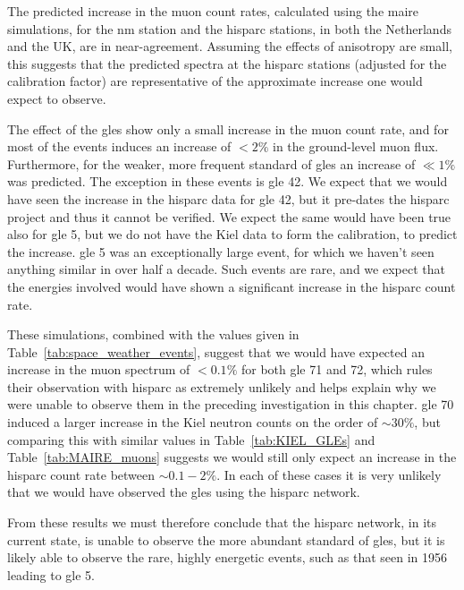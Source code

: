The predicted increase in the muon count rates, calculated using the \gls{maire} simulations, for the \gls{nm} station and the \gls{hisparc} stations, in both the Netherlands and the UK, are in near-agreement. Assuming the effects of anisotropy are small, this suggests that the predicted spectra at the \gls{hisparc} stations (adjusted for the calibration factor) are representative of the approximate increase one would expect to observe.

The effect of the \glspl{gle} show only a small increase in the muon count rate, and for most of the events induces an increase of $< 2 \%$ in the ground-level muon flux. Furthermore, for the weaker, more frequent standard of \glspl{gle} an increase of $\ll 1\%$ was predicted. The exception in these events is \gls{gle} 42. We expect that we would have seen the increase in the \gls{hisparc} data for \gls{gle} 42, but it pre-dates the \gls{hisparc} project and thus it cannot be verified. We expect the same would have been true also for \gls{gle} 5, but we do not have the Kiel data to form the calibration, to predict the increase. \gls{gle} 5 was an exceptionally large event, for which we haven't seen anything similar in over half a decade. Such events are rare, and we expect that the energies involved would have shown a significant increase in the \gls{hisparc} count rate.

These simulations, combined with the values given in Table~\ref{tab:space_weather_events}, suggest that we would have expected an increase in the muon spectrum of $< 0.1\%$ for both \gls{gle} 71 and 72, which rules their observation with \gls{hisparc} as extremely unlikely and helps explain why we were unable to observe them in the preceding investigation in this chapter. \gls{gle} 70 induced a larger increase in the Kiel neutron counts on the order of $\sim 30\%$, but comparing this with similar values in Table~\ref{tab:KIEL_GLEs} and Table~\ref{tab:MAIRE_muons} suggests we would still only expect an increase in the \gls{hisparc} count rate between $\sim 0.1 - 2 \%$. In each of these cases it is very unlikely that we would have observed the \glspl{gle} using the \gls{hisparc} network.

From these results we must therefore conclude that the \gls{hisparc} network, in its current state, is unable to observe the more abundant standard of \glspl{gle}, but it is likely able to observe the rare, highly energetic events, such as that seen in 1956 leading to \gls{gle} 5.



